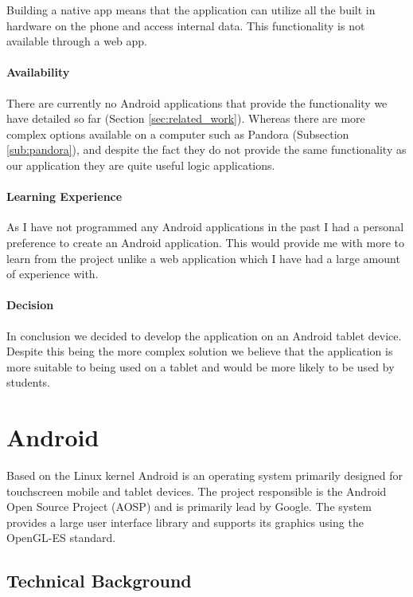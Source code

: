 \documentclass{report}
\begin{document}
Building a native app means that the application can utilize all the built in hardware on the phone and access internal data. This functionality is not available through a web app.

\subsubsection{Availability}

There are currently no Android applications that provide the functionality we have detailed so far (Section \ref{sec:related_work}). Whereas there are more complex options available on a computer such as Pandora (Subsection \ref{sub:pandora}), and despite the fact they do not provide the same functionality as our application they are quite useful logic applications. 

\subsubsection{Learning Experience}

As I have not programmed any Android applications in the past I had a personal preference to create an Android application. This would provide me with more to learn from the project unlike a web application which I have had a large amount of experience with.

\subsubsection{Decision}

In conclusion we decided to develop the application on an Android tablet device. Despite this being the more complex solution we believe that the application is more suitable to being used on a tablet and would be more likely to be used by students.

\chapter{Android}

Based on the Linux kernel Android is an operating system primarily designed for touchscreen mobile and tablet devices\cite{androidwiki}. The project responsible is the Android Open Source Project (AOSP) and is primarily lead by Google. The system provides a large user interface library and supports its graphics using the OpenGL-ES standard\cite{opengl}.

\section{Technical Background}
\end{document}
